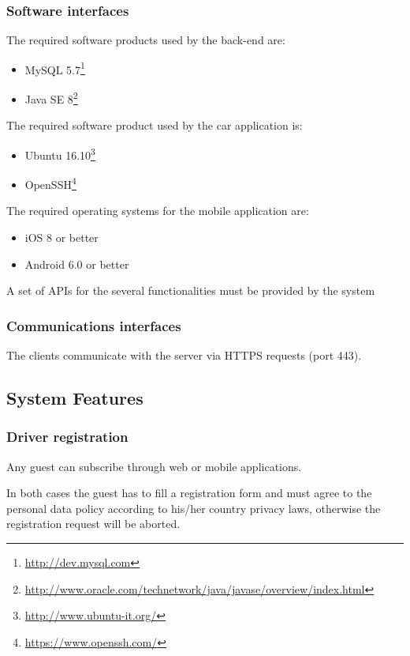 \begin{itemize}
\subsubsection{Software interfaces}
The required software products used by the back-end are:
\begin{itemize}
	\item MySQL 5.7\footnote{\url{http://dev.mysql.com}}
	\item Java SE 8\footnote{\url{http://www.oracle.com/technetwork/java/javase/overview/index.html}}
\end{itemize}
The required software product used by the car application is:
\begin{itemize}
	\item Ubuntu 16.10\footnote{\url{http://www.ubuntu-it.org/}}
	\item OpenSSH\footnote{\url{https://www.openssh.com/}}
\end{itemize}
The required operating systems for the mobile application are:
\begin{itemize}
	\item iOS 8 or better
	\item Android 6.0 or better
\end{itemize}

A set of APIs for the several functionalities must be provided by the system
	
\subsubsection{Communications interfaces}
The clients communicate with the server via HTTPS requests (port 443).

\end{itemize}

\subsection{System Features}

\subsubsection{Driver registration}

Any guest can subscribe through web or mobile applications.

In both cases the guest has to fill a registration form and must agree to the personal data policy according to his/her country privacy laws, otherwise the registration request will be aborted.

